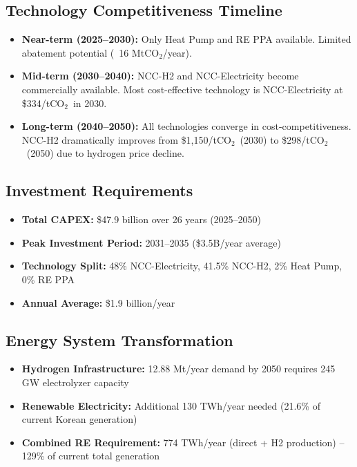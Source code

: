 \documentclass[11pt,a4paper]{report}
\newcommand{\mtco}{MtCO$_2$}
\newcommand{\tco}{tCO$_2$}
\begin{document}
\subsection*{Technology Competitiveness Timeline}

\begin{itemize}[leftmargin=*]
    \item \textbf{Near-term (2025--2030):} Only Heat Pump and RE PPA available. Limited abatement potential (~16 \mtco/year).

    \item \textbf{Mid-term (2030--2040):} NCC-H2 and NCC-Electricity become commercially available. Most cost-effective technology is NCC-Electricity at \$334/\tco\ in 2030.

    \item \textbf{Long-term (2040--2050):} All technologies converge in cost-competitiveness. NCC-H2 dramatically improves from \$1,150/\tco\ (2030) to \$298/\tco\ (2050) due to hydrogen price decline.
\end{itemize}

\subsection*{Investment Requirements}

\begin{itemize}[leftmargin=*]
    \item \textbf{Total CAPEX:} \$47.9 billion over 26 years (2025--2050)
    \item \textbf{Peak Investment Period:} 2031--2035 (\$3.5B/year average)
    \item \textbf{Technology Split:} 48\% NCC-Electricity, 41.5\% NCC-H2, 2\% Heat Pump, 0\% RE PPA
    \item \textbf{Annual Average:} \$1.9 billion/year
\end{itemize}

\subsection*{Energy System Transformation}

\begin{itemize}[leftmargin=*]
    \item \textbf{Hydrogen Infrastructure:} 12.88 Mt/year demand by 2050 requires 245 GW electrolyzer capacity
    \item \textbf{Renewable Electricity:} Additional 130 TWh/year needed (21.6\% of current Korean generation)
    \item \textbf{Combined RE Requirement:} 774 TWh/year (direct + H2 production) -- 129\% of current total generation
\end{itemize}
\end{document}
